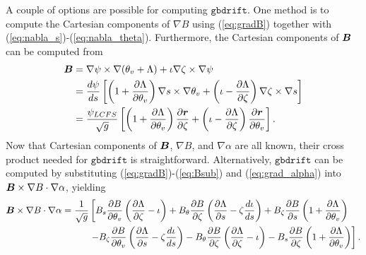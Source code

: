 \documentclass[11pt,letter]{article}
\newcommand{\vect}[1]{\mbox{\boldmath $#1$}}
\newcommand{\gbdrift}{\mathtt{gbdrift}}
\begin{document}
A couple of options are possible for computing $\gbdrift$. One method is to compute the Cartesian components of $\nabla B$ using
(\ref{eq:gradB})
together with (\ref{eq:nabla_s})-(\ref{eq:nabla_theta}). Furthermore, the Cartesian components of $\vect{B}$ can be computed from
\begin{align}
\vect{B} &= \nabla\psi \times \nabla (\theta_v + \Lambda) + \iota \nabla\zeta\times\nabla\psi \nonumber \\
&= \frac{d\psi}{ds} \left[ \left( 1 + \frac{\partial\Lambda}{\partial\theta_v}\right) \nabla s \times\nabla\theta_v 
+ \left(\iota - \frac{\partial\Lambda}{\partial\zeta}\right) \nabla\zeta\times\nabla s \right] \nonumber \\
&= \frac{\psi_{LCFS}}{\sqrt{g}} \left[ \left(1 + \frac{\partial\Lambda}{\partial\theta_v}\right) \frac{\partial\vect{r}}{\partial\zeta}
+ \left( \iota - \frac{\partial\Lambda}{\partial\zeta}\right) \frac{\partial\vect{r}}{\partial\theta_v}\right].
\end{align}
Now that Cartesian components of $\vect{B}$, $\nabla B$, and $\nabla \alpha$ are all known, their cross product
needed for $\gbdrift$ is straightforward. Alternatively, $\gbdrift$ can be computed by substituting (\ref{eq:gradB})-(\ref{eq:Bsub}) and (\ref{eq:grad_alpha}) into $\vect{B}\times\nabla B \cdot\nabla\alpha$, yielding
\begin{align}
\vect{B}\times\nabla B \cdot\nabla\alpha
=
\frac{1}{\sqrt{g}} &\left[
B_s \frac{\partial B}{\partial \theta_v} \left(\frac{\partial \Lambda}{\partial\zeta} - \iota \right)
+ B_\theta \frac{\partial B}{\partial\zeta} \left( \frac{\partial\Lambda}{\partial s} - \zeta \frac{d\iota}{ds}\right)
+ B_\zeta \frac{\partial B}{\partial s} \left( 1 + \frac{\partial \Lambda}{\partial \theta_v}\right) \right. \nonumber \\
&\left.-B_\zeta \frac{\partial B}{\partial\theta_v} \left( \frac{\partial\Lambda}{\partial s} - \zeta \frac{d\iota}{ds}\right)
-B_\theta \frac{\partial B}{\partial\zeta} \left( \frac{\partial \Lambda}{\partial\zeta}-\iota\right)
-B_s \frac{\partial B}{\partial\zeta} \left( 1 + \frac{\partial\Lambda}{\partial\theta_v}\right)
\right].
\end{align}
\end{document}
